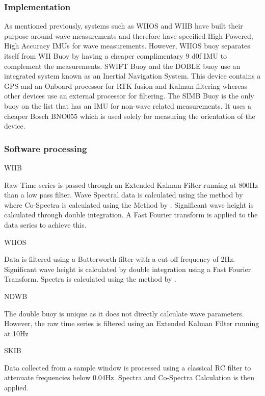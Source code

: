 \subsubsection{Implementation}
As mentioned previously, systems such as WIIOS and WIIB have built their purpose around wave measurements and therefore have specified High Powered, High Accuracy IMUs for wave measurements. However, WIIOS buoy separates itself from WII Buoy by having a cheaper complimentary 9 d0f IMU to complement the measurements. SWIFT Buoy and the DOBLE buoy use an integrated system known as an Inertial Navigation System. This device contains a GPS and an Onboard processor for RTK fusion and Kalman filtering whereas other devices use an external processor for filtering. The SIMB Buoy is the only buoy on the list that has an IMU for non-wave related measurements. It uses a cheaper Bosch BNO055 which is used solely for measuring the orientation of the device.

\subsubsection{Software processing}

\par{WIIB}	

Raw Time series is passed through an Extended Kalman Filter running at 800Hz than a low pass filter. Wave Spectral data is calculated using the method by \textcite{earle1996nondirectional} where Co-Spectra is calculated using the Method by \textcite{kuik1988method}. Significant wave height is calculated through double integration. A Fast Fourier transform is applied to the data series to achieve this.
\par{WIIOS}

Data is filtered using a Butterworth filter with a cut-off frequency of 2Hz. Significant wave height is calculated by double integration using a Fast Fourier Transform. Spectra is calculated using the method by \textcite{earle1996nondirectional}.

\par{NDWB}

The double buoy is unique as it does not directly calculate wave parameters. However, the raw time series is filtered using an Extended Kalman Filter running at 10Hz

\par{SKIB}

Data collected from a sample window is processed using a classical RC filter to attenuate frequencies below 0.04Hz. \textcite{earle1996nondirectional} Spectra and Co-Spectra  Calculation is then applied.

